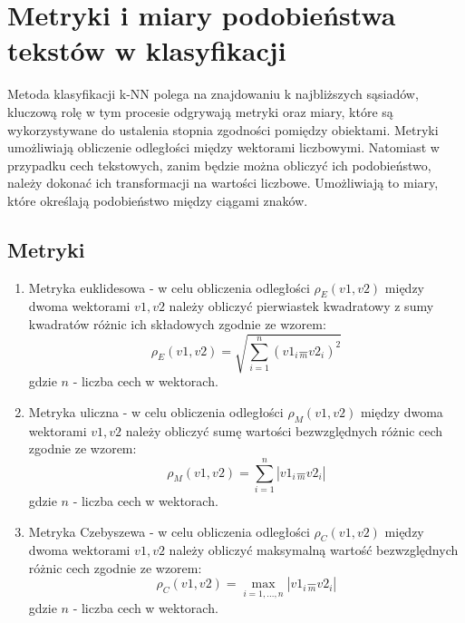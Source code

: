 \documentclass{article}
\begin{document}
\section{Metryki i miary podobieństwa tekstów w klasyfikacji}
Metoda klasyfikacji k-NN polega na znajdowaniu k najbliższych sąsiadów, kluczową rolę w tym procesie odgrywają metryki oraz miary, które są wykorzystywane do ustalenia stopnia zgodności pomiędzy obiektami. Metryki umożliwiają obliczenie odległości między wektorami liczbowymi. Natomiast w przypadku cech tekstowych, zanim będzie można obliczyć ich podobieństwo, należy dokonać ich transformacji na wartości liczbowe. Umożliwiają to miary, które określają podobieństwo między ciągami znaków.

\subsection{Metryki}
\begin{enumerate}
    \item Metryka euklidesowa - w celu obliczenia odległości \(\rho_E(v1, v2)\) między dwoma wektorami \(v1, v2\) należy obliczyć pierwiastek kwadratowy z sumy kwadratów różnic ich składowych zgodnie ze wzorem:
        \begin{equation}
      \rho_E(v1, v2) = \sqrt{\sum_{i=1}^{n} (v1_i \underset{m}{-} v2_i)^2}  
        \end{equation}
        gdzie \(n\) - liczba cech w wektorach.
        
    \item Metryka uliczna - w celu obliczenia odległości \(\rho_M(v1, v2)\) między dwoma wektorami \(v1, v2\) należy obliczyć sumę wartości bezwzględnych różnic cech zgodnie ze wzorem:
        \begin{equation}
          \rho_M(v1, v2) = \sum_{i=1}^{n} |v1_i \underset{m}{-} v2_i|
        \end{equation}
        gdzie \(n\) - liczba cech w wektorach.
        
    \item Metryka Czebyszewa - w celu obliczenia odległości \(\rho_C(v1, v2)\) między dwoma wektorami \(v1, v2\) należy obliczyć maksymalną wartość bezwzględnych różnic cech zgodnie ze wzorem:
        \begin{equation}
          \rho_C(v1, v2) = \max_{i = 1,...,n} |v1_i \underset{m}{-} v2_i|
        \end{equation}
        gdzie \(n\) - liczba cech w wektorach.
\end{enumerate}
\end{document}
